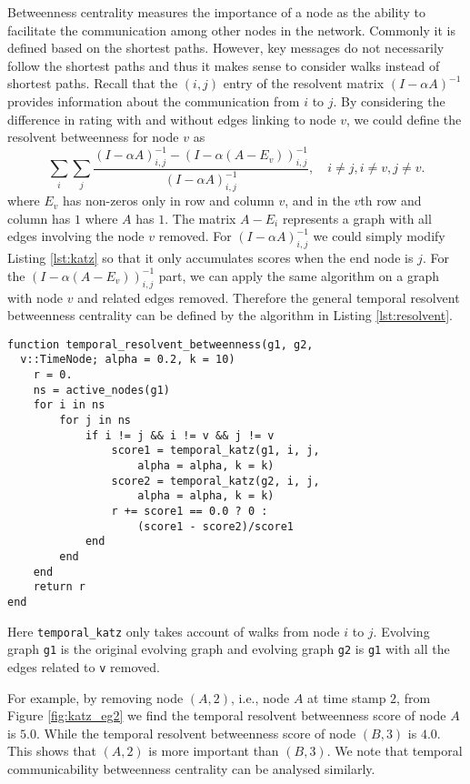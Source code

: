 \documentclass[12pt]{article}
\theoremstyle{definition}
\begin{document}
Betweenness centrality measures the importance of a node as the ability to facilitate the communication among other nodes in the network. Commonly it is defined based on the shortest paths. However, key messages do not necessarily follow the shortest paths and thus it makes sense to consider walks instead of shortest paths.
Recall that the $(i,j)$ entry of the resolvent matrix $(I - \alpha A)^{-1}$ provides information about the communication from $i$ to $j$.
By considering the difference in rating with and without edges linking to node $v$, we could define the resolvent betweenness for node $v$ as
\begin{equation}
  \sum_{i}\sum_j \frac{(I-\alpha A)^{-1}_{i,j} - (I - \alpha (A - E_v))^{-1}_{i,j}}{(I - \alpha A)^{-1}_{i,j}}, \quad i \ne j, i \ne v, j \ne v.
\end{equation}
where $E_v$ has non-zeros only in row and column $v$, and in the $v$th row and column has $1$ where $A$ has $1$.
The matrix $A - E_i$ represents a graph with all edges involving the node $v$ removed.
For $(I-\alpha A)^{-1}_{i,j}$ we could simply modify Listing \ref{lst:katz} so that it only accumulates scores when the end node is $j$. For the $(I - \alpha (A-E_v))^{-1}_{i,j}$ part, we can apply the same algorithm on a graph with node $v$ and related edges removed.
Therefore the general temporal resolvent betweenness centrality can be defined by the algorithm in Listing \ref{lst:resolvent}.
\begin{lstlisting}[caption={Temporal Resolvent Betweenness of Single Node},label={lst:resolvent}, captionpos=b]
function temporal_resolvent_betweenness(g1, g2,
  v::TimeNode; alpha = 0.2, k = 10)
    r = 0.
    ns = active_nodes(g1)
    for i in ns
        for j in ns
            if i != j && i != v && j != v
                score1 = temporal_katz(g1, i, j,
                    alpha = alpha, k = k)
                score2 = temporal_katz(g2, i, j,
                    alpha = alpha, k = k)
                r += score1 == 0.0 ? 0 :
                    (score1 - score2)/score1
            end
        end
    end
    return r
end
\end{lstlisting}
Here \texttt{temporal\_katz} only takes account of walks from node $i$ to $j$. Evolving graph
\texttt{g1} is the original evolving graph and evolving graph \texttt{g2} is \texttt{g1} with all the edges
related to \texttt{v} removed.

For example, by removing node $(A, 2)$, i.e., node $A$ at time stamp $2$, from Figure \ref{fig:katz_eg2} we find
the temporal resolvent betweenness score of node $A$ is $5.0$. While the temporal resolvent betweenness score of node $(B,3)$ is $4.0$. This shows that $(A,2)$ is more important than $(B,3)$.
We note that temporal communicability betweenness centrality can be analysed similarly.
\end{document}
